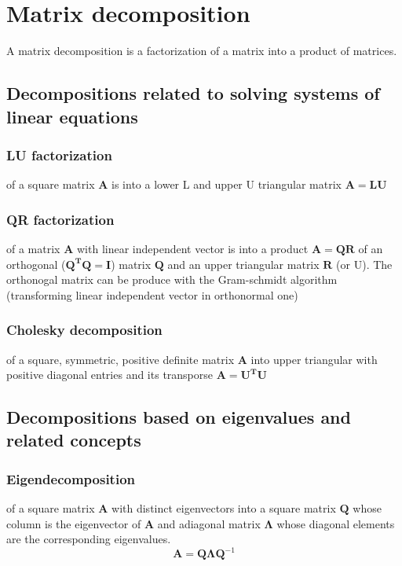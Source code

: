\documentclass[twocolumn]{article}
\numberwithin{equation}{section}
\begin{document}
	
\section{Matrix decomposition}
A matrix decomposition is a factorization of a matrix into a product of matrices.

	\subsection{Decompositions related to solving systems of linear equations}
		\subsubsection{LU factorization}
of a square matrix $\mathbf{A}$ is into a lower L and upper U triangular matrix $\mathbf{A = LU}$ 
	
		\subsubsection{QR factorization } 
of a matrix $\mathbf{A}$ with linear independent vector is into a product $\mathbf{A = QR}$ of an orthogonal ($\mathbf{Q^TQ=I}$) matrix $\mathbf{Q}$ and an upper triangular matrix $\mathbf{R}$ (or U). The orthonogal matrix can be produce with the Gram-schmidt algorithm (transforming linear independent vector in orthonormal one)
	
		\subsubsection{Cholesky decomposition} 
of a square, symmetric, positive definite matrix $\mathbf{A}$ into upper triangular with positive diagonal entries and its transporse $\mathbf{A=U^TU}$

	\subsection{Decompositions based on eigenvalues and related concepts}
		\subsubsection{Eigendecomposition}
of a square matrix $\mathbf{A}$ with distinct eigenvectors into a square matrix $\mathbf{Q}$ whose column is the eigenvector of $\mathbf{A}$ and adiagonal matrix $\mathbf{\Lambda}$  whose diagonal elements are the corresponding eigenvalues.
	$$\mathbf{A}=\mathbf{Q}\mathbf{\Lambda}\mathbf{Q}^{-1}  $$
\end{document}
